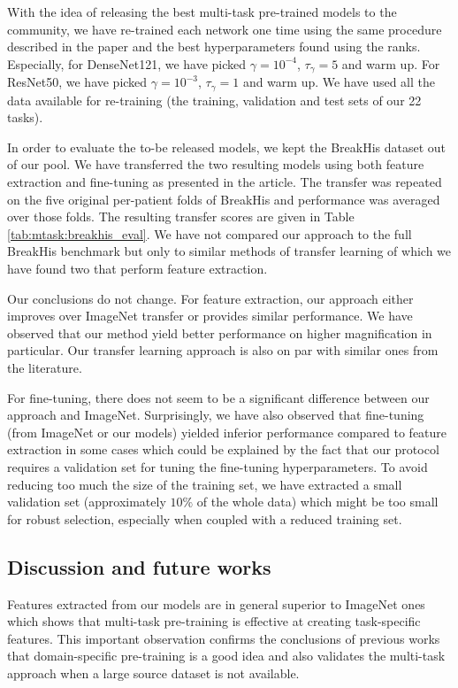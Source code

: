 With the idea of releasing the best multi-task pre-trained models to the community, we have re-trained each network one time using the same procedure described in the paper and the best hyperparameters found using the ranks. Especially, for DenseNet121, we have picked $\gamma = 10^{-4}$, $\tau_\gamma = 5$ and warm up. For ResNet50, we have picked $\gamma = 10^{-3}$, $\tau_\gamma = 1$ and warm up. We have used all the data available for re-training (\ie the training, validation and test sets of our 22 tasks).

In order to evaluate the to-be released models, we kept the BreakHis dataset \cite{spanhol2015dataset} out of our pool. We have transferred the two resulting models using both feature extraction and fine-tuning as presented in the article. The transfer was repeated on the five original per-patient folds of BreakHis and performance was averaged over those folds. The resulting transfer scores are given in Table \ref{tab:mtask:breakhis_eval}. We have not compared our approach to the full BreakHis benchmark but only to similar methods of transfer learning of which we have found two \cite{spanhol2017deep, song2017supervised} that perform feature extraction.

Our conclusions do not change. For feature extraction, our approach either improves over ImageNet transfer or provides similar performance. We have observed that our method yield better performance on higher magnification in particular. Our transfer learning approach is also on par with similar ones from the literature.

For fine-tuning, there does not seem to be a significant difference between our approach and ImageNet. Surprisingly, we have also observed that fine-tuning (from ImageNet or our models) yielded inferior performance compared to feature extraction in some cases which could be explained by the fact that our protocol requires a validation set for tuning the fine-tuning hyperparameters. To avoid reducing too much the size of the training set, we have extracted a small validation set (approximately $10\%$ of the whole data) which might be too small for robust selection, especially when coupled with a reduced training set.

\subsection{Discussion and future works}
\label{ssec:mtask:res:discussion}

Features extracted from our models are in general superior to ImageNet ones %
which shows that multi-task pre-training is effective at creating task-specific features. This important observation confirms the conclusions of previous works that domain-specific pre-training is a good idea and also validates the multi-task approach when a large source dataset is not available. 

